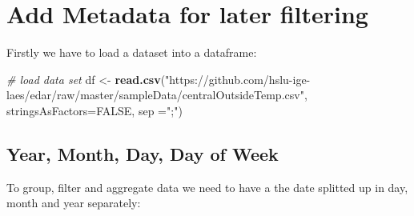 \documentclass[
]{book}
\newenvironment{Shaded}{\begin{snugshade}}{\end{snugshade}}
\newcommand{\CommentTok}[1]{\textcolor[rgb]{0.56,0.35,0.01}{\textit{#1}}}
\newcommand{\DataTypeTok}[1]{\textcolor[rgb]{0.13,0.29,0.53}{#1}}
\newcommand{\KeywordTok}[1]{\textcolor[rgb]{0.13,0.29,0.53}{\textbf{#1}}}
\newcommand{\NormalTok}[1]{#1}
\newcommand{\OperatorTok}[1]{\textcolor[rgb]{0.81,0.36,0.00}{\textbf{#1}}}
\newcommand{\OtherTok}[1]{\textcolor[rgb]{0.56,0.35,0.01}{#1}}
\newcommand{\StringTok}[1]{\textcolor[rgb]{0.31,0.60,0.02}{#1}}
\begin{document}
\hypertarget{add-metadata-for-later-filtering}{%
\section{Add Metadata for later filtering}\label{add-metadata-for-later-filtering}}

Firstly we have to load a dataset into a dataframe:

\begin{Shaded}
\begin{Highlighting}[]

\CommentTok{# load data set}
\NormalTok{df <-}\StringTok{ }\KeywordTok{read.csv}\NormalTok{(}\StringTok{"https://github.com/hslu-ige-laes/edar/raw/master/sampleData/centralOutsideTemp.csv"}\NormalTok{,}
               \DataTypeTok{stringsAsFactors=}\OtherTok{FALSE}\NormalTok{, }\DataTypeTok{sep =}\StringTok{";"}\NormalTok{)}
\end{Highlighting}
\end{Shaded}

\hypertarget{year-month-day-day-of-week}{%
\subsection{Year, Month, Day, Day of Week}\label{year-month-day-day-of-week}}

To group, filter and aggregate data we need to have a the date splitted up in day, month and year separately:

\begin{Shaded}
\end{Shaded}
\end{document}
